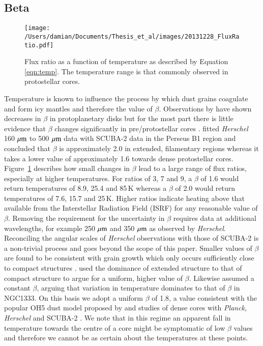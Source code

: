 \subsection{Beta}
\begin{figure}
\begin{centering}
\texttt{[image: /Users/damian/Documents/Thesis\_et\_al/images/20131228\_FluxRatio.pdf]}
\caption{Flux ratio as a function of temperature as described by Equation \ref{eqn:temp}. The temperature range is that commonly observed in protostellar cores.} \label{fig:SR_temp}
\end{centering}
\end{figure} 
Temperature is known to influence the process by which dust grains coagulate 
and form icy mantles and therefore the value of $\beta$. Observations by 
\cite{Ubach:2012fk} have shown decreases in $\beta$ in protoplanetary disks 
but for the most part there is little evidence that $\beta$ changes significantly in 
pre/protostellar cores \citep{Schnee:2014uq}. \cite{Sadavoy:2013qf} fitted 
\emph{Herschel} 160\,$\,\mu\rm{m}$ to 500\,$\,\mu\rm{m}$ data with SCUBA-2 data in 
the Perseus B1 region  and concluded that $\beta$ is approximately 2.0 in 
extended, filamentary regions whereas it takes a lower value of approximately 
1.6 towards dense protostellar cores. 
Figure~\ref{fig:SR_temp} describes how small changes in $\beta$ lead to a 
large range of flux ratios, especially at higher temperatures. For ratios of 3, 7 
and 9, a $\beta$ of 1.6 would return temperatures of 8.9, 25.4 and 85\,K whereas 
a $\beta$ of 2.0 would return temperatures of 7.6, 15.7 and 25\,K. Higher ratios 
indicate heating above that available from the Interstellar Radiation Field (ISRF) 
for any reasonable value of $\beta$. 
Removing the requirement for the uncertainty in $\beta$ requires data at additional 
wavelengths, for example 250\,$\,\mu\rm{m}$ and 350\,$\,\mu\rm{m}$ as observed by 
\emph{Herschel}. Reconciling the angular scales of \emph{Herschel} observations 
with those of SCUBA-2 is a non-trivial process and goes beyond the scope of this paper. 
Smaller values of $\beta$ are found to be consistent with grain growth which only 
occurs sufficiently close to compact structures \citep{Ossenkopf:1994vn}. 
\cite{Stutz:2010hq} used the dominance of extended structure to that of compact 
structure to argue for a uniform, higher value of $\beta$. Likewise \cite{Hatchell:2013ij} 
assumed a constant $\beta$, arguing that variation in temperature dominates to that 
of $\beta$ in NGC1333. On this basis we adopt a uniform $\beta$ of 1.8, a value 
consistent with the popular OH5 dust model proposed by \cite{Ossenkopf:1994vn} 
and studies of dense cores with \emph{Planck}, \emph{Herschel} and SCUBA-2 
\citep{Stutz:2010hq, Juvela:2011ys, Sadavoy:2013qf}. We note that in this regime an 
apparent fall in temperature towards the centre of a core might be symptomatic of 
low $\beta$ values and therefore we cannot be as certain about the temperatures 
at these points.


